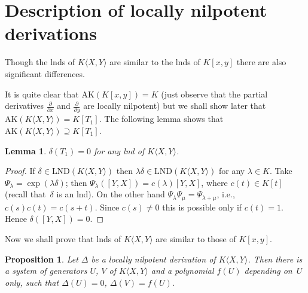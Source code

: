 \documentclass[pdftex]{sigma}
\numberwithin{equation}{section}
\newtheorem{Lemma}[Theorem]{Lemma}
\newtheorem{Proposition}[Theorem]{Proposition}
\begin{document}
\section{Description of locally nilpotent derivations}

Though the lnds of $K\langle X,Y\rangle$ are similar to the lnds of $K[x,y]$ there are also significant differences.

It is quite clear that $\text{AK}(K[x, y]) = K$ (just observe that the partial derivatives $\frac{\partial}{\partial x}$ and $\frac{\partial}{\partial y}$ are locally nilpotent)
but we shall show later that $\text{AK}(K\langle X,Y\rangle) = K[T_1]$. The following lemma shows that $\text{AK}(K\langle X,Y\rangle) \supseteq K[T_1]$.

\begin{Lemma}\label{commutator goes to 0} $\delta(T_1) = 0$ for any lnd of $K\langle X,Y\rangle$.
\end{Lemma}

\begin{proof} If $\delta \in \text{LND}(K\langle X,Y\rangle)$ then $\lambda\delta \in \text{LND}(K\langle X,Y\rangle)$ for any $\lambda \in K$. Take $\Psi_{\lambda} = \exp(\lambda\delta)$; then $\Psi_{\lambda}([Y,X]) = c(\lambda)[Y,X]$, where $c(t) \in K[t]$ (recall that~$\delta$ is an lnd). On the other hand $\Psi_{\lambda} \Psi_{\mu} = \Psi_{\lambda + \mu}$, i.e., $c(s)c(t) =c(s + t)$. Since $c(s) \ne 0$ this is possible only if $c(t) = 1$. Hence $\delta([Y,X]) = 0$.
\end{proof}

Now we shall prove that lnds of $K\langle X,Y\rangle$ are similar to those of $K[x,y]$.

\begin{Proposition}\label{similarity} Let $\Delta$ be a locally nilpotent derivation of $K\langle X,Y\rangle$. Then there is a system of generators $U$, $V$ of $K\langle X,Y\rangle$ and a polynomial $f(U)$ depending on~$U$ only, such that $\Delta(U)=0$, $\Delta(V)=f(U)$.
\end{Proposition}
\end{document}

